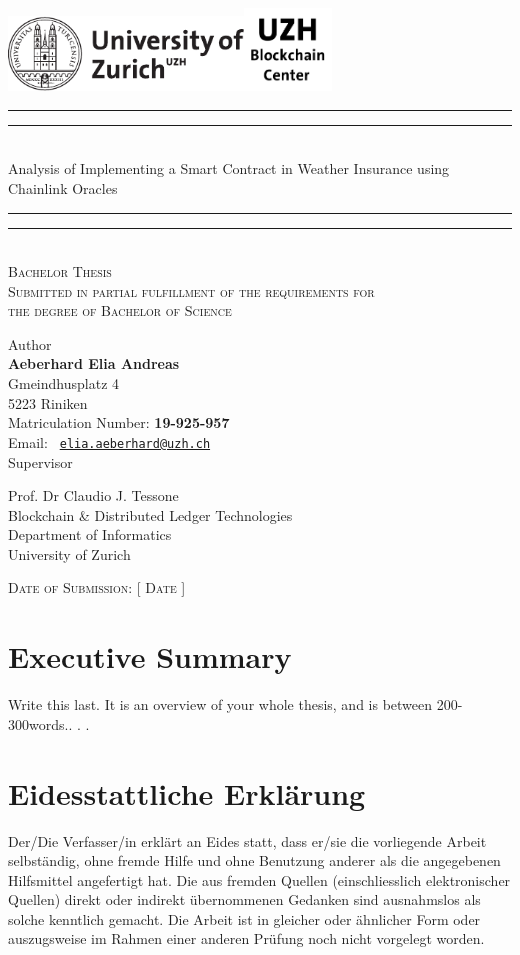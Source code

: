 \documentclass[11pt,a4paper,english,oneside]{book}
\makeatletter
\newcommand*{\uzhlogo}{\includegraphics[height=2cm]{Logo-UZH-black}}
\newcommand*{\bcclogo}{\includegraphics[height=2.2cm]{Logo-BCC-black}}
\newcommand*{\titleGP}{\begingroup %
\centering %
\vspace*{\baselineskip} %
\uzhlogo\hspace{8cm}\bcclogo\\[2\baselineskip] %

\rule{\textwidth}{1.6pt}\vspace*{-\baselineskip}\vspace*{2pt} %
\rule{\textwidth}{0.4pt}\\[\baselineskip] %
{\LARGE \sc Analysis of Implementing a Smart Contract in Weather Insurance using Chainlink Oracles}\\[0.2\baselineskip] %
\rule{\textwidth}{0.4pt}\vspace*{-\baselineskip}\vspace{3.2pt} %
\rule{\textwidth}{1.6pt}\\[2\baselineskip] %
\scshape %
Bachelor Thesis\\[2\baselineskip]
Submitted in partial fulfillment of the requirements for \\ the degree of Bachelor of Science \par
\vspace*{2\baselineskip}
Author\\
{\Large \textbf{Aeberhard Elia Andreas} \\ [8pt]
 }
Gmeindhusplatz 4 \\ 5223 Riniken \\[5pt]
Matriculation Number: \textbf{19-925-957}\\[8pt]
 Email: \texttt{ \href{mailto:elia.aeberhard@uzh.ch} {elia.aeberhard@uzh.ch} }  \\


\vspace*{2\baselineskip}
Supervisor\\
{\Large Prof. Dr Claudio J. Tessone\\[8pt]
\small Blockchain \& Distributed Ledger Technologies\\[5pt]Department of Informatics \\[8pt]University of Zurich\par}
\vspace*{2\baselineskip}

\vfill
{\scshape Date of Submission: [ Date ]} \\[0.3\baselineskip]
\endgroup}
\makeatother
\begin{document}
\thispagestyle{empty}
\titleGP
\newpage
\onehalfspacing
\setcounter{page}{1}

\section*{Executive Summary}
\thispagestyle{firststyle}
Write  this  last.   It  is  an  overview  of  your  whole  thesis,  and  is  between  200-300words.. . .


\tableofcontents
\newpage
{}








\newpage

\appendix
\noappendicestocpagenum
\addappheadtotoc
\appendixpage

\renewcommand{\theequation}{A.\arabic{equation}}


%

\printbibliography

\newpage
\thispagestyle{firststyle}
\section*{Eidesstattliche Erklärung}
Der/Die Verfasser/in erklärt an Eides statt, dass er/sie die vorliegende Arbeit selbständig, ohne fremde Hilfe und ohne Benutzung anderer als die angegebenen Hilfsmittel angefertigt hat. Die aus fremden Quellen (einschliesslich elektronischer Quellen) direkt oder indirekt übernommenen Gedanken sind ausnahmslos als solche kenntlich gemacht. Die Arbeit ist in gleicher oder ähnlicher Form oder auszugsweise im Rahmen einer anderen Prüfung noch nicht vorgelegt worden.\\[2cm]
 \hfill {}
\end{document}
